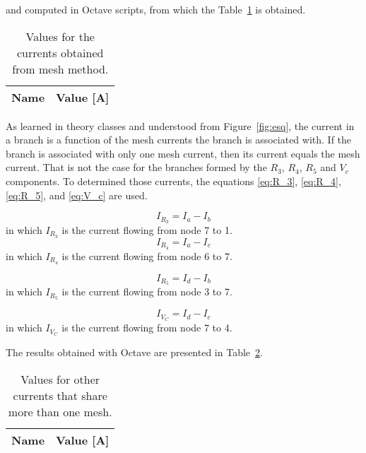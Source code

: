 and computed in Octave scripts, from which the Table~\ref{tab:op1} is obtained.

\begin{table}[h]
  \centering
  \begin{tabular}{|l|r|}
    \hline    
    {\bf Name} & {\bf Value [A]} \\ \hline
    
  \end{tabular}
  \caption{Values for the currents obtained from mesh method.}
  \label{tab:op1}
\end{table}

As learned in theory classes and understood from Figure~\ref{fig:esq}, the current in a branch is a function of the mesh currents the branch is associated with. If the branch is associated with only one mesh current, then its current equals the mesh current. That is not the case for the branches formed by the $R_3$, $R_4$, $R_5$ and $V_c$ components. To determined those currents, the equations \ref{eq:R_3}, \ref{eq:R_4}, \ref{eq:R_5}, and \ref{eq:V_c} are used.

\begin{equation}
  I_{R_3}=I_a-I_b
  \label{eq:R_3}
\end{equation}
in which $I_{R_3}$ is the current flowing from node 7 to 1.
\begin{equation}
  I_{R_4}=I_a-I_c
  \label{eq:R_4}
\end{equation}
in which $I_{R_4}$ is the current flowing from node 6 to 7.

\begin{equation}
  I_{R_5}=I_d-I_b
  \label{eq:R_5}
\end{equation}
in which $I_{R_5}$ is the current flowing from node 3 to 7.

\begin{equation}
  I_{V_C}=I_d-I_c
  \label{eq:V_c}
\end{equation}
in which $I_{V_C}$ is the current flowing from node 7 to 4.

The results obtained with Octave are presented in Table~\ref{tab:op2}.

\begin{table}[h]
  \centering
  \begin{tabular}{|l|r|}
    \hline    
    {\bf Name} & {\bf Value [A]} \\ \hline
    
  \end{tabular}
  \caption{Values for other currents that share more than one mesh.}
  \label{tab:op2}
\end{table}



